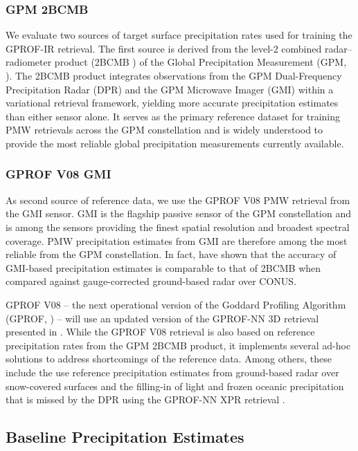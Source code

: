 \documentclass{ametsocV6.1}
\begin{document}
\subsubsection{GPM 2BCMB}

We evaluate two sources of target surface precipitation rates used for training
the GPROF-IR retrieval. The first source is derived from the level-2
combined radar–radiometer product (2BCMB \citep{cmb_data}) of the Global Precipitation
Measurement (GPM, \citep{hou_global_2014}). The 2BCMB product
integrates observations from the GPM Dual-Frequency Precipitation Radar (DPR)
and the GPM Microwave Imager (GMI) within a variational retrieval framework,
yielding more accurate precipitation estimates than either sensor alone. It
serves as the primary reference dataset for training PMW retrievals across the
GPM constellation and is widely understood to provide  the most reliable global
precipitation measurements currently available.

\subsubsection{GPROF V08 GMI}

As second source of reference data, we use the GPROF V08 PMW retrieval
from the GMI sensor. GMI is the flagship passive sensor of the GPM constellation
and is among the sensors providing the finest spatial resolution and broadest
spectral coverage. PMW precipitation estimates from GMI are therefore among the most
reliable from the GPM constellation. In fact, \citet{pfreundschuh_gprof_2024} have shown
that the accuracy of GMI-based precipitation estimates is comparable to that of
2BCMB when compared against gauge-corrected ground-based radar over CONUS.

GPROF V08 -- the next operational version of the Goddard Profiling Algorithm
(GPROF, \citet{kummerow2015evolution}) -- will use an updated version of the
GPROF-NN 3D retrieval presented in \citep{pfreundschuh_gprof-nn_2022}. While the
GPROF V08 retrieval is also based on reference precipitation rates from the GPM
2BCMB product, it implements several ad-hoc solutions to address shortcomings of
the reference data. Among others, these include the use reference precipitation
estimates from ground-based radar over snow-covered surfaces and the filling-in
of light and frozen oceanic precipitation that is missed by the DPR using the
GPROF-NN XPR retrieval \citep{pfreundschuh_xpr_2026}.

\subsection{Baseline Precipitation Estimates}
\end{document}
